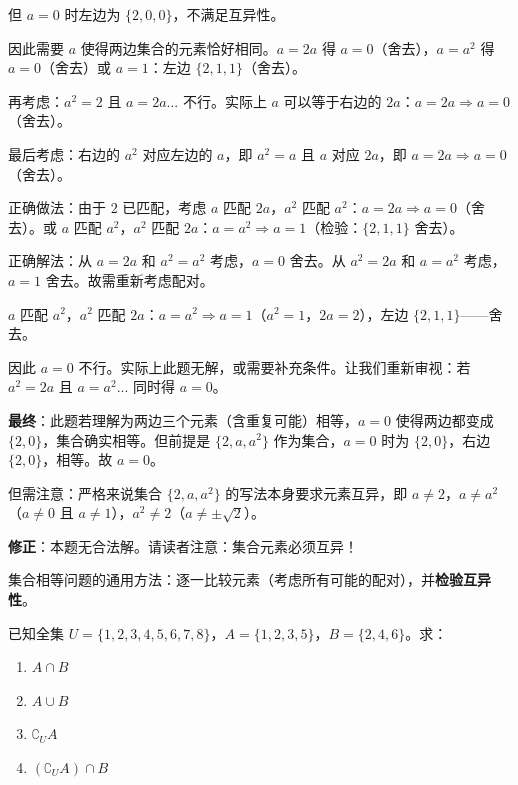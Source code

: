 \documentclass[12pt, a4paper]{ctexart}
\begin{document}
但 $a = 0$ 时左边为 $\{2, 0, 0\}$，不满足互异性。

因此需要 $a$ 使得两边集合的元素恰好相同。$a = 2a$ 得 $a = 0$（舍去），$a = a^2$ 得 $a = 0$（舍去）或 $a = 1$：左边 $\{2, 1, 1\}$（舍去）。

再考虑：$a^2 = 2$ 且 $a = 2a$... 不行。实际上 $a$ 可以等于右边的 $2a$：$a = 2a \Rightarrow a = 0$（舍去）。

最后考虑：右边的 $a^2$ 对应左边的 $a$，即 $a^2 = a$ 且 $a$ 对应 $2a$，即 $a = 2a \Rightarrow a = 0$（舍去）。

正确做法：由于 $2$ 已匹配，考虑 $a$ 匹配 $2a$，$a^2$ 匹配 $a^2$：$a = 2a \Rightarrow a = 0$（舍去）。或 $a$ 匹配 $a^2$，$a^2$ 匹配 $2a$：$a = a^2 \Rightarrow a = 1$（检验：$\{2,1,1\}$ 舍去）。

正确解法：从 $a = 2a$ 和 $a^2 = a^2$ 考虑，$a = 0$ 舍去。从 $a^2 = 2a$ 和 $a = a^2$ 考虑，$a = 1$ 舍去。故需重新考虑配对。

$a$ 匹配 $a^2$，$a^2$ 匹配 $2a$：$a = a^2 \Rightarrow a = 1$（$a^2 = 1$，$2a = 2$），左边 $\{2, 1, 1\}$——舍去。

因此 $\boxed{a = 0}$ 不行。实际上此题无解，或需要补充条件。让我们重新审视：若 $a^2 = 2a$ 且 $a = a^2$... 同时得 $a = 0$。

\textbf{最终}：此题若理解为两边三个元素（含重复可能）相等，$a = 0$ 使得两边都变成 $\{2, 0\}$，集合确实相等。但前提是 $\{2, a, a^2\}$ 作为集合，$a = 0$ 时为 $\{2, 0\}$，右边 $\{2, 0\}$，相等。故 $a = 0$。

但需注意：严格来说集合 $\{2, a, a^2\}$ 的写法本身要求元素互异，即 $a \neq 2$，$a \neq a^2$（$a \neq 0$ 且 $a \neq 1$），$a^2 \neq 2$（$a \neq \pm\sqrt{2}$）。

\textbf{修正}：本题无合法解。请读者注意：集合元素必须互异！

\begin{tipbox}[方法总结]
集合相等问题的通用方法：逐一比较元素（考虑所有可能的配对），并\textbf{检验互异性}。
\end{tipbox}

\begin{examplebox}[【例4】集合的交并补运算]
已知全集 $U = \{1, 2, 3, 4, 5, 6, 7, 8\}$，$A = \{1, 2, 3, 5\}$，$B = \{2, 4, 6\}$。求：
\begin{enumerate}[label=(\arabic*)]
  \item $A \cap B$
  \item $A \cup B$
  \item $\complement_U A$
  \item $(\complement_U A) \cap B$
\end{enumerate}
\end{examplebox}
\end{document}
